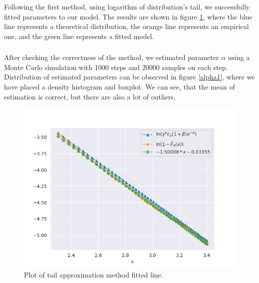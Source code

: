 \documentclass{article}
\begin{document}
		Following the first method, using logarithm of distribution's tail, we successfully fitted parameters to our model.
		The results are shown in figure \ref{tails1}, where the blue line represents a theoretical distribution, the orange line represents an empirical one, and the green line represents a fitted model.
		\subsubsection{}
        After checking the correctness of the method, we estimated parameter $\alpha$ using a Monte Carlo simulation with 1000 steps and 20000 samples on each step.
		Distribution of estimated parameters can be observed in figure \ref{alpha1}, where we have placed a density histogram and boxplot.
		We can see, that the mean of estimation is correct, but there are also a lot of outliers.		 
		
		\begin{figure}[H]
			\centering
			\includegraphics[width=1\linewidth]{images/compare_cdf_plots_type_1.png}
			\caption{Plot of tail approximation method fitted line.}\label{tails1}
		\end{figure}
\end{document}
